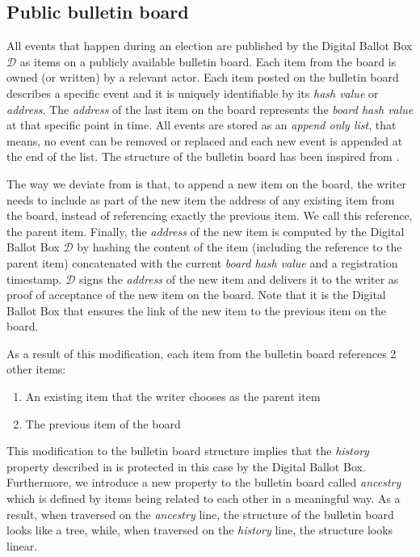 \subsection{Public bulletin board} \label{sec: public bulletin board}
All events that happen during an election are published by the Digital Ballot Box $\mathcal{D}$ as items on a publicly available bulletin board. Each item from the board is owned (or written) by a relevant actor. Each item posted on the bulletin board describes a specific event and it is uniquely identifiable by its \textit{hash value} or \textit{address}. The \textit{address} of the last item on the board represents the \textit{board hash value} at that specific point in time. All events are stored as an \textit{append only list}, that means, no event can be removed or replaced and each new event is appended at the end of the list. The structure of the bulletin board has been inspired from \cite{Heather09}.

The way we deviate from \cite{Heather09} is that, to append a new item on the board, the writer needs to include as part of the new item the address of any existing item from the board, instead of referencing exactly the previous item. We call this reference, the parent item. Finally, the \textit{address} of the new item is computed by the Digital Ballot Box $\mathcal{D}$ by hashing the content of the item (including the reference to the parent item) concatenated with the current \textit{board hash value} and a registration timestamp. $\mathcal{D}$ signs the \textit{address} of the new item and delivers it to the writer as proof of acceptance of the new item on the board. Note that it is the Digital Ballot Box that ensures the link of the new item to the previous item on the board.

As a result of this modification, each item from the bulletin board references 2 other items:
\begin{enumerate}
    \item An existing item that the writer chooses as the parent item
    \item The previous item of the board
\end{enumerate}

This modification to the bulletin board structure implies that the \textit{history} property described in \cite{Heather09} is protected in this case by the Digital Ballot Box. Furthermore, we introduce a new property to the bulletin board called \textit{ancestry} which is defined by items being related to each other in a meaningful way. As a result, when traversed on the \textit{ancestry} line, the structure of the bulletin board looks like a tree, while, when traversed on the \textit{history} line, the structure looks linear. 

